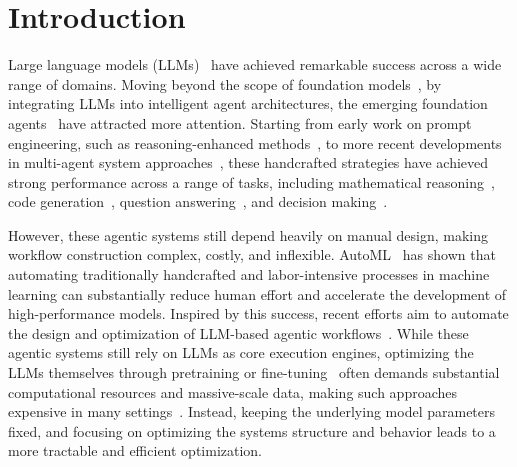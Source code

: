 \documentclass{article}
\theoremstyle{plain}
\theoremstyle{definition}
\theoremstyle{remark}
\begin{document}
\section{Introduction}

Large language models (LLMs)~\citep{brown_language_2020} have achieved remarkable success across a wide range of domains. Moving beyond the scope of foundation models~\citep{bommasani_opportunities_2022}, by integrating LLMs into intelligent agent architectures, the emerging foundation agents~\citep{liu_advances_2025} have attracted more attention. Starting from early work on prompt engineering, such as reasoning-enhanced methods~\citep{wei2023chainofthoughtpromptingelicitsreasoning,wang2023selfconsistencyimproveschainthought,yao_tree_2023}, to more recent developments in multi-agent system approaches~\citep{du_improving_2023,li_camel_2023,hong_metagpt_2024}, these handcrafted strategies have achieved strong performance across a range of tasks, including mathematical reasoning~\citep{cobbe_training_2021}, code generation~\citep{austin_program_2021}, question answering~\citep{yang2018hotpotqadatasetdiverseexplainable}, and decision making~\citep{10970024}.



However, these agentic systems still depend heavily on manual design, making workflow construction complex, costly, and inflexible. AutoML~\citep{10.5555/3360092} has shown that automating traditionally handcrafted and labor-intensive processes in machine learning can substantially reduce human effort and accelerate the development of high-performance models. Inspired by this success, recent efforts aim to automate the design and optimization of LLM-based agentic workflows~\citep{lee_compound_2025}. While these agentic systems still rely on LLMs as core execution engines, optimizing the LLMs themselves through pretraining or fine-tuning~\citep{rafailov_direct_2023} often demands substantial computational resources and massive-scale data, making such approaches expensive in many settings~\citep{kaplan_scaling_2020}. Instead, keeping the underlying model parameters fixed, and focusing on optimizing the systems structure and behavior leads to a more tractable and efficient optimization.
\end{document}
